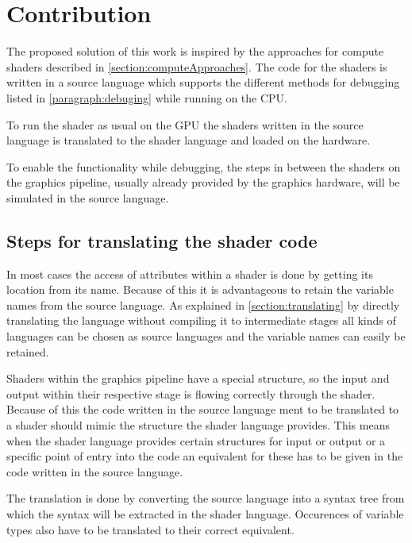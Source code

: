 

\chapter{Contribution}\label{cha:Contribution}

The proposed solution of this work is inspired by the approaches for compute shaders described in \autoref{section:computeApproaches}. The code for the shaders is written in a source language which supports the different methods for debugging listed in \autoref{paragraph:debuging} while running on the CPU.

To run the shader as usual on the GPU the shaders written in the source language is translated to the shader language and loaded on the hardware.

To enable the functionality while debugging, the steps in between the shaders on the graphics pipeline, usually already provided by the graphics hardware, will be simulated in the source language.

\section{Steps for translating the shader code}
\label{section:contribution_translating}

In most cases the access of attributes within a shader is done by getting its location from its name. Because of this it is advantageous to retain the variable names from the source language. As explained in \autoref{section:translating} by directly translating the language without compiling it to intermediate stages all kinds of languages can be chosen as source languages and the variable names can easily be retained.

Shaders within the graphics pipeline have a special structure, so the input and output within their respective stage is flowing correctly through the shader. Because of this the code written in the source language ment to be translated to a shader should mimic the structure the shader language provides. This means when the shader language provides certain structures for input or output or a specific point of entry into the code an equivalent for these has to be given in the code written in the source language.

The translation is done by converting the source language into a syntax tree from which the syntax will be extracted in the shader language. Occurences of variable types also have to be translated to their correct equivalent.

